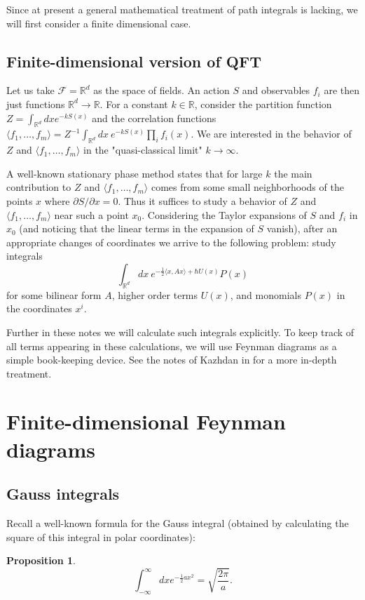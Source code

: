 \documentclass[10pt]{amsart}
\newtheorem{prop}[thm]{Proposition}
\theoremstyle{definition}
\theoremstyle{remark}
\newcommand{\R}{\mathbb R}
\newcommand{\dd}{\partial}
\def\<{\langle}
\def\>{\rangle}
\newcommand{\h}{\hbar}
\newcommand{\cF}{\mathcal{F}}
\begin{document}
Since at present
a general mathematical treatment of path integrals is lacking,
we will first consider a finite dimensional case.

\subsection{Finite-dimensional version of QFT}
\label{sub:fdim} Let us take $\cF=\R^d$ as the space of fields. An
action $S$ and observables $f_i$ are then just functions
$\R^d\to\R$. For a constant $k\in\R$, consider the partition
function $Z=\int_{\R^d}dx e^{-kS(x)}$ and the correlation
functions $\<f_1,\dots,f_m\>=Z^{-1}\int_{\R^d}dx\ e^{-kS(x)}\prod_i
f_i(x)$. We are interested in the behavior of $Z$ and
$\<f_1,\dots,f_m\>$ in the "quasi-classical limit" $k\to\infty$.

A well-known stationary phase method states that for large $k$ the
main contribution to $Z$ and $\<f_1,\dots,f_m\>$ comes from some
small neighborhoods of the points $x$ where $\dd S/\dd x=0$. Thus
it suffices to study a behavior of $Z$ and $\<f_1,\dots,f_m\>$
near such a point $x_0$. Considering the Taylor expansions of $S$
and $f_i$ in $x_0$ (and noticing that the linear terms in the
expansion of $S$ vanish), after an appropriate changes of
coordinates we arrive to the following problem: study integrals
$$\int_{\R^d}dx\ e^{-\frac12\<x,Ax\>+\h U(x)}P(x)$$ for some
bilinear form $A$, higher order terms $U(x)$, and monomials $P(x)$
in the coordinates $x^i$.

Further in these notes we will calculate such integrals
explicitly. To keep track of all terms appearing in these
calculations, we will use Feynman diagrams as a simple
book-keeping device. See the notes of Kazhdan in \cite{string}
for a more in-depth treatment.

\section{Finite-dimensional Feynman diagrams}
\label{sec:findim}

\subsection{Gauss integrals}
Recall a well-known formula for the Gauss integral (obtained by
calculating the square of this integral in polar coordinates):
\begin{prop}\label{prop:gauss}
$$
         \int_{-\infty}^\infty dx e^{-\frac12ax^2}=\sqrt{\frac{2\pi}a}.
$$
\end{prop}
\end{document}
